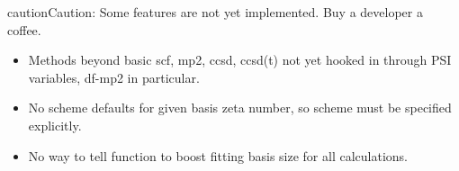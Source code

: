 \documentclass[letterpaper,10pt,english]{sphinxmanual}
\begin{document}
\begin{fulllineitems}
\begin{notice}{caution}{Caution:}
Some features are not yet implemented. Buy a developer a coffee.
\begin{itemize}
\item {} 
Methods beyond basic scf, mp2, ccsd, ccsd(t) not yet hooked in through PSI variables, df-mp2 in particular.

\item {} 
No scheme defaults for given basis zeta number, so scheme must be specified explicitly.

\item {} 
No way to tell function to boost fitting basis size for all calculations.

\end{itemize}
\end{notice}


\end{fulllineitems}
\end{document}
